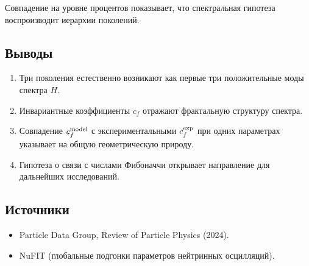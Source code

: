 \documentclass[12pt,a4paper]{article}
\begin{document}
Совпадение на уровне процентов показывает, что спектральная гипотеза воспроизводит иерархии поколений.

\subsection{Выводы}
\begin{enumerate}
  \item Три поколения естественно возникают как первые три положительные моды спектра $H$.
  \item Инвариантные коэффициенты $c_f$ отражают фрактальную структуру спектра.
  \item Совпадение $c_f^{\rm model}$ с экспериментальными $c_f^{\rm exp}$ при одних параметрах 
  указывает на общую геометрическую природу.
  \item Гипотеза о связи с числами Фибоначчи открывает направление для дальнейших исследований.
\end{enumerate}

\subsection{Источники}
\begin{itemize}
  \item Particle Data Group, Review of Particle Physics (2024).  
  \item NuFIT (глобальные подгонки параметров нейтринных осцилляций).  
\end{itemize}
\end{document}
